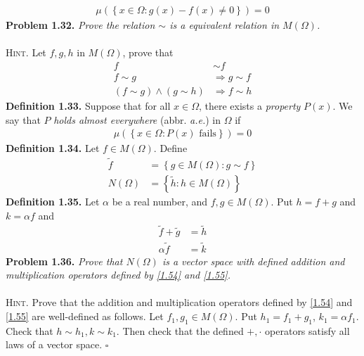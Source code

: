 \documentclass[a4paper]{article}
\numberwithin{equation}{section}
\begin{document}
\begin{align}
\mu \left( {\left\{ {x \in \Omega :g\left( x \right) - f\left( x \right) \ne 0} \right\}} \right) = 0
\end{align}
\textbf{Problem 1.32.} \textit{Prove the relation $\sim$ is a equivalent relation in $M\left(\Omega\right)$.}\\
\\
\textsc{Hint.} Let $f,g,h$ in $M\left(\Omega\right)$, prove that
\begin{align}
f &\sim f\\
f \sim g &\Rightarrow g \sim f\\
\left( {f \sim g} \right) \wedge \left( {g \sim h} \right) &\Rightarrow f \sim h
\end{align}
\textbf{Definition 1.33.} Suppose that for all $x \in \Omega$, there exists a \textit{property} $P\left(x\right)$. We say that $P$ \textit{holds almost everywhere} (abbr. \textit{a.e.}) in $\Omega$ if 
\begin{align}
\mu \left( {\left\{ {x \in \Omega :P\left( x \right)\mbox{ fails}} \right\}} \right) = 0
\end{align}
\textbf{Definition 1.34.} Let $f \in M\left(\Omega\right)$. Define
\begin{align}
\widetilde f &= \left\{ {g \in M\left( \Omega  \right):g \sim f} \right\}\\
N\left( \Omega  \right) &= \left\{ {\widetilde h:h \in M\left( \Omega  \right)} \right\}
\end{align}
\textbf{Definition 1.35.} Let $\alpha $ be a real number, and $f,g \in M\left(\Omega\right)$. Put $h=f+g$ and $k=\alpha f$ and 
\begin{align}
\label{1.54}
\widetilde f + \widetilde g &= \widetilde h\\
\alpha \widetilde f &= \widetilde k \label{1.55}
\end{align}
\textbf{Problem 1.36.} \textit{Prove that $N\left(\Omega\right)$ is a vector space with defined addition and multiplication operators defined by \eqref{1.54} and \eqref{1.55}.}\\
\\
\textsc{Hint.} Prove that the addition and multiplication operators defined by \eqref{1.54} and \eqref{1.55} are well-defined as follows. Let $f_1,g_1\in M\left(\Omega\right)$. Put $h_1=f_1+g_1$, $k_1=\alpha f_1$. Check that $h \sim {h_1},k \sim {k_1}$. Then check that the defined $+,\cdot$ operators satisfy all laws of a vector space. \hfill $\square$\\
\\
\end{document}
